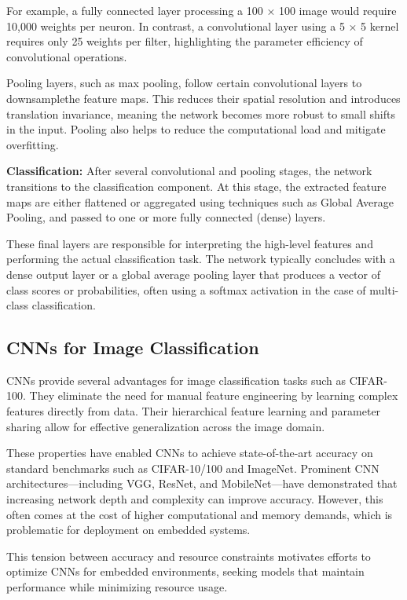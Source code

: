 For example, a fully connected layer processing a 100 × 100 image would require 10,000 weights per neuron. In contrast, a convolutional layer using a 5 × 5 kernel requires only 25 weights per filter, highlighting the parameter efficiency of convolutional operations.

Pooling layers, such as max pooling, follow certain convolutional layers to downsamplethe feature maps. This reduces their spatial resolution and introduces translation invariance, meaning the network becomes more robust to small shifts in the input. Pooling also helps to reduce the computational load and mitigate overfitting.

\textbf{Classification:}
\newline
After several convolutional and pooling stages, the network transitions to the classification component. At this stage, the extracted feature maps are either flattened or aggregated using techniques such as Global Average Pooling, and passed to one or more fully connected (dense) layers.

These final layers are responsible for interpreting the high-level features and performing the actual classification task. The network typically concludes with a dense output layer or a global average pooling layer that produces a vector of class scores or probabilities, often using a softmax activation in the case of multi-class classification.


\subsection{CNNs for Image Classification}

CNNs provide several advantages for image classification tasks such as CIFAR-100. They eliminate the need for manual feature engineering by learning complex features directly from data. Their hierarchical feature learning and parameter sharing allow for effective generalization across the image domain.

These properties have enabled CNNs to achieve state-of-the-art accuracy on standard benchmarks such as CIFAR-10/100 and ImageNet. Prominent CNN architectures---including VGG, ResNet, and MobileNet---have demonstrated that increasing network depth and complexity can improve accuracy. However, this often comes at the cost of higher computational and memory demands, which is problematic for deployment on embedded systems.

This tension between accuracy and resource constraints motivates efforts to optimize CNNs for embedded environments, seeking models that maintain performance while minimizing resource usage.

